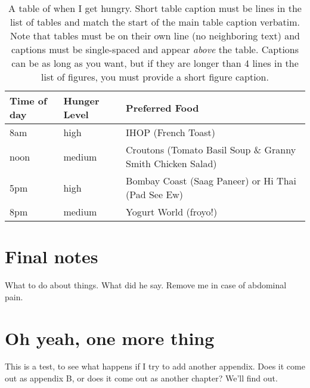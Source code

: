 \documentclass[12pt,chapterheads]{ucsd}
\begin{document}
\vspace{0.25in}
\begin{table}[!ht]
\caption[A table of when I get hungry.  Short table caption must be  lines in the list of tables]{A table of when I get hungry. Short table caption must be  lines in the list of tables and match the start of the main table caption verbatim.  Note that tables must be on their own line (no neighboring text) and captions must be single-spaced and appear \protect\textit{above} the table.  Captions can be as long as you want, but if they are longer than 4 lines in the list of figures, you must provide a short figure caption.}

\vspace{-0.25in}
\begin{center}
\begin{tabular}{|p{1in}|p{2in}|p{3in}|}

\hline
Time of day & Hunger Level & Preferred Food \\

\hline
8am & high & IHOP (French Toast) \\

\hline
noon & medium & Croutons (Tomato Basil Soup \& Granny Smith Chicken Salad) \\

\hline
5pm & high & Bombay Coast (Saag Paneer) or Hi Thai (Pad See Ew) \\

\hline
8pm & medium & Yogurt World (froyo!) \\

\hline
\end{tabular}
\end{center}
\label{tab:analysis3}
\end{table}



\appendix
\chapter{Final notes}
What to do about things.  What did he say.
  Remove me in case of abdominal pain.

\chapter{Oh yeah, one more thing}
This is a test, to see what happens if I try to add another
appendix. Does it come out as appendix B, or does it come out as another chapter?
We'll find out.


\end{document}

